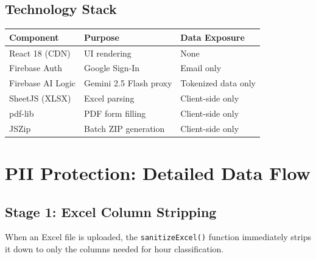 \documentclass[11pt,letterpaper]{article}
\begin{document}
\subsection{Technology Stack}

\begin{table}[h]
\centering
\begin{tabularx}{\textwidth}{lXl}
\toprule
\textbf{Component} & \textbf{Purpose} & \textbf{Data Exposure} \\
\midrule
React 18 (CDN) & UI rendering & None \\
Firebase Auth & Google Sign-In & Email only \\
Firebase AI Logic & Gemini 2.5 Flash proxy & Tokenized data only \\
SheetJS (XLSX) & Excel parsing & Client-side only \\
pdf-lib & PDF form filling & Client-side only \\
JSZip & Batch ZIP generation & Client-side only \\
\bottomrule
\end{tabularx}
\end{table}

\section{PII Protection: Detailed Data Flow}

\subsection{Stage 1: Excel Column Stripping}

When an Excel file is uploaded, the \texttt{sanitizeExcel()} function immediately strips it down to only the columns needed for hour classification.
\end{document}
